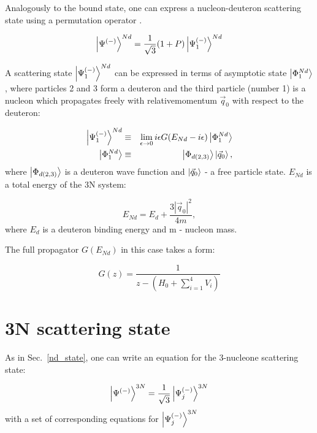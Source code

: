     Analogously to the bound state, one can express a nucleon-deuteron
    scattering state
    using a permutation operator .

    \begin{equation}
        \ket{\Psi^{(-)}}^{Nd} = \frac{1}{\sqrt{3}}(1+P)\ket{\Psi^{(-)}_1}^{Nd}    
    \end{equation}

    A scattering state $\ket{\Psi^{(-)}_1}^{Nd}$ can be expressed
    in terms of asymptotic state $\ket{\Phi^{Nd}_1}$, where particles
    2 and 3 form a deuteron and the third particle (number 1) is a nucleon
    which propagates freely with relativemomentum $\vec{q}_0$ with 
    respect to the deuteron:

    \begin{eqnarray}
        \ket{\Psi^{(-)}_1}^{Nd} &\equiv& \lim_{\epsilon \rightarrow 0} 
        i \epsilon G(E_{Nd} - i\epsilon)\ket{\Phi^{Nd}_1}\\
        \ket{\Phi^{Nd}_1} &\equiv& \ket{\Phi_{d(2,3)}}\ket{\vec{q}_0},
    \end{eqnarray}
    where $\ket{\Phi_{d(2,3)}}$ is a deuteron wave function and 
    $\ket{\vec{q}_0}$ - a free particle state. $E_{Nd}$
    is a total energy of the 3N system:

    \begin{equation}
        E_{Nd} = E_d + \frac{3 |\vec{q}_0|^2}{4m},
    \end{equation}
    where $E_d$ is a deuteron binding energy and m - nucleon mass. 

    The full propagator $G(E_{Nd})$ in this case takes a form:
    
    \begin{equation}
        G(z)= \frac{1}{z - (H_0 + \sum_{i=1}^4V_i)}
    \end{equation}


\section{3N scattering state}

    As in Sec.~\ref{nd_state}, one can
    write an equation for the 3-nucleone scattering state:

    \begin{equation}
        \ket{\Psi^{(-)}}^{3N} = \frac{1}{\sqrt{3}}\ket{\Psi^{(-)}_j}^{3N}    
    \end{equation}
    with a set of corresponding equations for $\ket{\Psi^{(-)}_j}^{3N}$


